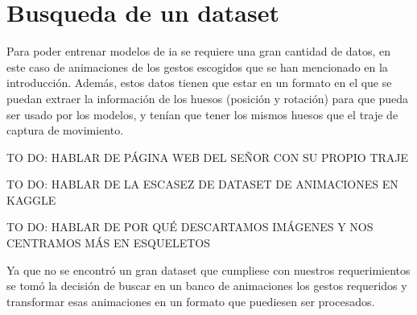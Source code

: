 \section{Busqueda de un dataset}
\label{sec:busquedaDataset}
Para poder entrenar modelos de \gls{ia} se requiere una gran cantidad de datos, en este caso de animaciones de los gestos escogidos que se han mencionado en la introducción. 
Además, estos datos tienen que estar en un formato en el que se puedan extraer la información de los huesos (posición y rotación) para que pueda ser usado por los modelos, y tenían que tener los mismos huesos que el traje de captura de movimiento.

TO DO: HABLAR DE PÁGINA WEB DEL SEÑOR CON SU PROPIO TRAJE

TO DO: HABLAR DE LA ESCASEZ DE DATASET DE ANIMACIONES EN KAGGLE

TO DO: HABLAR DE POR QUÉ DESCARTAMOS IMÁGENES Y NOS CENTRAMOS MÁS EN ESQUELETOS

Ya que no se encontró un gran dataset que cumpliese con nuestros requerimientos se tomó la decisión de buscar en un banco de animaciones los gestos requeridos y transformar esas animaciones en un formato que puediesen ser procesados.